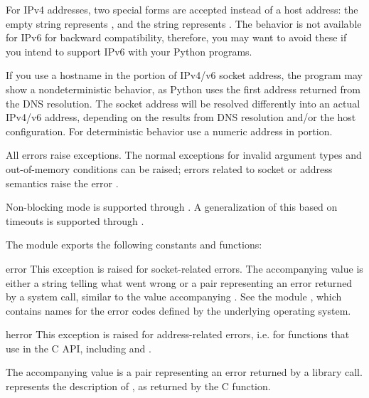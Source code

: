 For IPv4 addresses, two special forms are accepted instead of a host
address: the empty string represents , and the string
 represents .
The behavior is not available for IPv6 for backward compatibility,
therefore, you may want to avoid these if you intend to support IPv6 with
your Python programs.

If you use a hostname in the  portion of IPv4/v6 socket
address, the program may show a nondeterministic behavior, as Python
uses the first address returned from the DNS resolution.  The socket
address will be resolved differently into an actual IPv4/v6 address,
depending on the results from DNS resolution and/or the host
configuration.  For deterministic behavior use a numeric address in
 portion.


All errors raise exceptions.  The normal exceptions for invalid
argument types and out-of-memory conditions can be raised; errors
related to socket or address semantics raise the error
.

Non-blocking mode is supported through
.  A generalization of this based on timeouts
is supported through .

The module  exports the following constants and functions:


\begin{excdesc}{error}
This exception is raised for socket-related errors.
The accompanying value is either a string telling what went wrong or a
pair 
representing an error returned by a system
call, similar to the value accompanying .
See the module , which contains
names for the error codes defined by the underlying operating system.
\end{excdesc}

\begin{excdesc}{herror}
This exception is raised for address-related errors, i.e. for
functions that use  in the C API, including
 and .

The accompanying value is a pair 
representing an error returned by a library call. 
represents the description of , as returned by
the  C function.
\end{excdesc}

